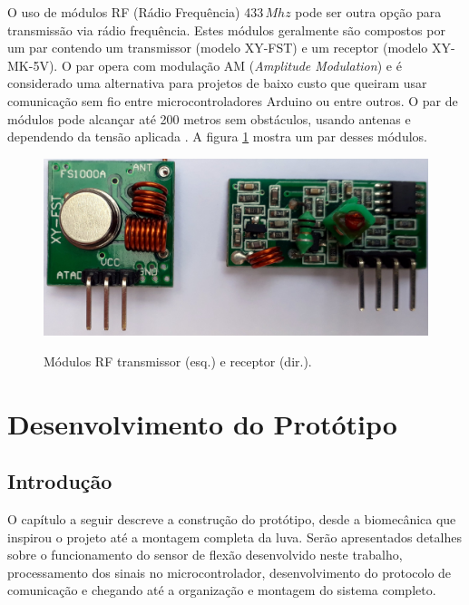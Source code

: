 \documentclass[
	12pt,				%
	openright,			%
	oneside,			%
	a4paper,			%
	english,			%
	brazil				%
	]{abntex2}
\begin{document}
		O uso de módulos RF (Rádio Frequência) 433$\,Mhz$ pode ser outra opção para transmissão via rádio frequência. Estes módulos geralmente são compostos por um par contendo um transmissor (modelo XY-FST) e um receptor (modelo XY-MK-5V). O par opera com modulação AM (\textit{Amplitude Modulation}) e é considerado uma alternativa para projetos de baixo custo que queiram usar comunicação sem fio entre microcontroladores Arduino ou entre outros. O par de módulos pode alcançar até 200 metros sem obstáculos, usando antenas e dependendo da tensão aplicada \cite{institutodigitalrf}. A figura \ref{Fig:tx-rx1} mostra um par desses módulos.



		\begin{figure}[h!]
			\centering
			\caption{Módulos RF transmissor (esq.) e receptor (dir.).}
  		\includegraphics[width=12cm]{./figures/tx-rx1.jpg}
  		\label{Fig:tx-rx1}
		\end{figure}


%
%
	
	\chapter{Desenvolvimento do Protótipo}

		\section{Introdução}
		
		O capítulo a seguir descreve a construção do protótipo, desde a biomecânica que inspirou o projeto até a montagem completa da luva. Serão apresentados detalhes sobre o funcionamento do sensor de flexão desenvolvido neste trabalho, processamento dos sinais no microcontrolador, desenvolvimento do protocolo de comunicação e chegando até a organização e montagem do sistema completo.
		
\end{document}

